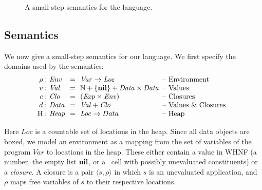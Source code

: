 \documentclass[9pt]{sigplanconf}
\begin{document}
\begin{figure*}[t!]
\begin{center}
\caption{A small-step semantics for the language. \label{fig:lang-semantics}}
\end{center}
\end{figure*}



\subsection{Semantics}
We now give  a small-step semantics for our  language.
We first specify the domains used by the semantics:
\[
\begin{array}{@{}r@{\ }l@{\ \ }c@{\ \ }l@{\hspace{0.5em}}l}
\rho: & \mathit{Env} &=&\mathit{Var} \rightarrow \mathit{Loc} & \mbox{-- Environment} \\
v:   & \mathit{Val} &=& \mathbb{N} + \{\NIL\} + \mathit{Data \times Data}& \mbox{-- Values}\\
c:   & \mathit{Clo} &=& \mathit{(Exp \times Env)}& \mbox{-- Closures}\\
d: & \mathit{Data} &=&\mathit{Val} + \mathit{Clo} & \mbox{-- Values \& Closures} \\
\heap: & \mathit{Heap} & =&\mathit{Loc} \rightarrow Data & \mbox{-- Heap}
\end{array}
\]

Here  $\mathit{Loc}$ is  a countable  set  of locations  in the  heap.
Since all data objects are boxed, we model an environment as a mapping
from the set  of variables of the program  $\mathit{Var}$ to locations
in the  heap.  These  either contain  a value in  WHNF (a  number, the
empty  list  $\mbox{$\mathbf{ nil}$}$,  or  a  \CONS\  cell  with  possibly  unevaluated
constituents) or  a {\em closure}.   A closure  is a pair  $\langle s,
\rho\rangle$ in  which $s$ is  an unevaluated application,  and $\rho$
maps free variables of $s$ to their respective locations.
\end{document}
